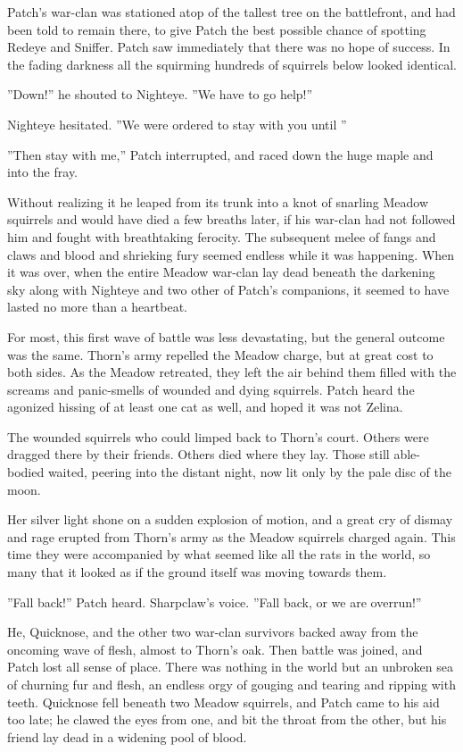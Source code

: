 \documentclass[11pt]{article}
\begin{document}
 Patch's war-clan was stationed atop of the tallest tree on the battlefront, and had been told to remain there, to give Patch the best possible chance of spotting Redeye and Sniffer. Patch saw immediately that there was no hope of success. In the fading darkness all the squirming hundreds of squirrels below looked identical.\par
 ''Down!'' he shouted to Nighteye. ''We have to go help!''\par
 Nighteye hesitated. ''We were ordered to stay with you until %
''\par
 ''Then stay with me,'' Patch interrupted, and raced down the huge maple and into the fray.\par
Without realizing it he leaped from its trunk into a knot of snarling Meadow squirrels %
 and would have died a few breaths later, if his war-clan had not followed him and fought with breathtaking ferocity. The subsequent melee of fangs and claws and blood and shrieking fury seemed endless while it was happening. When it was over, when the entire Meadow war-clan lay dead beneath the darkening sky along with Nighteye and two other of Patch's companions, it seemed to have lasted no more than a heartbeat.\par
 For most, this first wave of battle was less devastating, but the general outcome was the same. Thorn's army repelled the Meadow charge, but at great cost to both sides. As the Meadow retreated, they left the air behind them filled with the screams and panic-smells of wounded and dying squirrels. Patch heard the agonized hissing of at least one cat as well, and hoped it was not Zelina.\par
 The wounded squirrels who could limped back to Thorn's court. Others were dragged there by their friends. Others died where they lay. Those still able-bodied waited, peering into the distant night, now lit only by the pale disc of the moon.\par
Her silver light shone on a sudden explosion of motion, and a great cry of dismay and rage erupted from Thorn's army as the Meadow squirrels charged again. This time they were accompanied by what seemed like all the rats in the world, so many that it looked as if the ground itself was moving towards them.\par
 ''Fall back!'' Patch heard. Sharpclaw's voice. ''Fall back, or we are overrun!''\par
 He, Quicknose, and the other two war-clan survivors backed away from the oncoming wave of flesh, almost to Thorn's oak. Then battle was joined, and Patch lost all sense of place. There was nothing in the world but an unbroken sea of churning fur and flesh, an endless orgy of gouging and tearing and ripping with teeth. Quicknose fell beneath two Meadow squirrels, and Patch came to his aid too late; he clawed the eyes from one, and bit the throat from the other, but his friend lay dead in a widening pool of blood.\par
\end{document}
